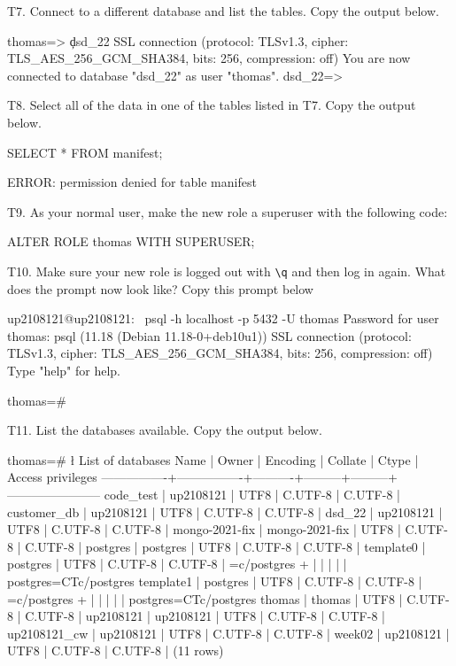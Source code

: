 T7. Connect to a different database and list the tables. Copy the output below.
\begin{pseudo}
thomas=> \c dsd_22
SSL connection (protocol: TLSv1.3, cipher: TLS_AES_256_GCM_SHA384, bits: 256, compression: off)
You are now connected to database "dsd_22" as user "thomas".
dsd_22=>
\end{pseudo}

T8. Select all of the data in one of the tables listed in T7. Copy the output below.
\begin{sql}
SELECT * FROM manifest;
\end{sql}
\begin{pseudo}
ERROR:  permission denied for table manifest
\end{pseudo}

T9. As your normal user, make the new role a superuser with the following code:
\begin{sql}
ALTER ROLE thomas WITH SUPERUSER;
\end{sql}

T10. Make sure your new role is logged out with \verb|\q| and then log in again. What does the prompt now look like? Copy this prompt below
\begin{pseudo}
up2108121@up2108121:~ psql -h localhost -p 5432 -U thomas
Password for user thomas:
psql (11.18 (Debian 11.18-0+deb10u1))
SSL connection (protocol: TLSv1.3, cipher: TLS_AES_256_GCM_SHA384, bits: 256, compression: off)
Type "help" for help.

thomas=#
\end{pseudo}

T11. List the databases available. Copy the output below.
\begin{pseudo}
thomas=# \l
                                   List of databases
      Name      |     Owner      | Encoding | Collate |  Ctype  |   Access privileges
----------------+----------------+----------+---------+---------+-----------------------
 code_test      | up2108121      | UTF8     | C.UTF-8 | C.UTF-8 |
 customer_db    | up2108121      | UTF8     | C.UTF-8 | C.UTF-8 |
 dsd_22         | up2108121      | UTF8     | C.UTF-8 | C.UTF-8 |
 mongo-2021-fix | mongo-2021-fix | UTF8     | C.UTF-8 | C.UTF-8 |
 postgres       | postgres       | UTF8     | C.UTF-8 | C.UTF-8 |
 template0      | postgres       | UTF8     | C.UTF-8 | C.UTF-8 | =c/postgres          +
                |                |          |         |         | postgres=CTc/postgres
 template1      | postgres       | UTF8     | C.UTF-8 | C.UTF-8 | =c/postgres          +
                |                |          |         |         | postgres=CTc/postgres
 thomas         | thomas         | UTF8     | C.UTF-8 | C.UTF-8 |
 up2108121      | up2108121      | UTF8     | C.UTF-8 | C.UTF-8 |
 up2108121_cw   | up2108121      | UTF8     | C.UTF-8 | C.UTF-8 |
 week02         | up2108121      | UTF8     | C.UTF-8 | C.UTF-8 |
(11 rows)
\end{pseudo}


